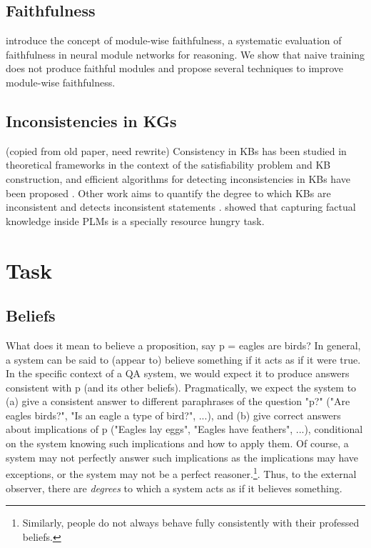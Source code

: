 \documentclass[11pt]{article}
\begin{document}
\subsection{Faithfulness}
\citet{subramanian-etal-2020-obtaining}
introduce the concept of module-wise faithfulness, a systematic evaluation of faithfulness in neural module networks for reasoning. We show that naive training does not produce faithful modules and propose several techniques to improve module-wise faithfulness. 

\subsection{Inconsistencies in KGs}
(copied from old paper, need rewrite)
Consistency in KBs has been
studied in theoretical frameworks in the context of the
satisfiability problem and KB construction, and efficient
algorithms for detecting inconsistencies in KBs have been
proposed \cite{hansen2000probabilistic,andersen2001easy}.
Other work aims to quantify the degree to which KBs are
inconsistent and detects inconsistent statements
\cite{Thimm:2009d,muino2011measuring,Thimm:2013}.
\cite{zhang2020need} showed that capturing factual knowledge inside PLMs is a specially resource hungry task.





\section{Task}

\subsection{Beliefs}

What does it mean to believe a proposition, say p = eagles are birds? In general, a system can
be said to (appear to) believe something if it acts as if it were true. In the specific
context of a QA system, we would expect it to produce answers consistent with p (and
its other beliefs). Pragmatically, we expect the system to (a) give a consistent answer to
different paraphrases of the question "p?" ("Are eagles birds?", "Is an eagle a type of bird?", ...),
and (b) give correct answers about implications of p ("Eagles lay eggs", "Eagles have feathers", ...),
conditional on the system knowing such implications and how to apply them.
Of course, a system may not perfectly answer such implications as the implications
may have exceptions, or the system may not be a perfect reasoner.\footnote{Similarly,
people do not always behave fully consistently with their professed beliefs.}.
Thus, to the external observer, there are {\it degrees} to which a system acts as if it
believes something.
\end{document}
